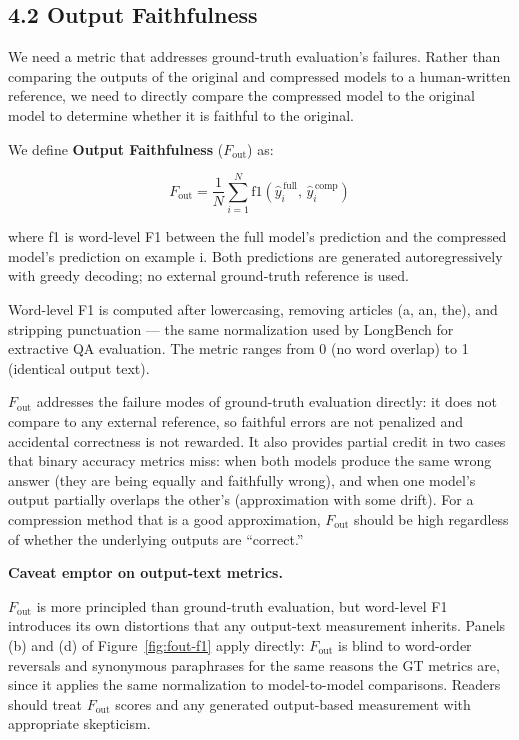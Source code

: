 \documentclass[10pt,letterpaper]{article}
\begin{document}
\hypertarget{output-faithfulness}{%
\subsection{4.2 Output Faithfulness}\label{output-faithfulness}}

We need a metric that addresses ground-truth evaluation’s failures. Rather than comparing the outputs
of the original and compressed models to a human-written reference, 
we need to directly compare the compressed model to
the original model to determine whether it is faithful to the original.

We define \textbf{Output Faithfulness}
(\(F_{\text{out}}\)) as:

\[
F_{\text{out}} = \frac{1}{N} \sum_{i=1}^{N}
  \text{f1}\!\left(\hat{y}^{\,\text{full}}_i,\, \hat{y}^{\,\text{comp}}_i\right)
\]

where f1 is word-level F1 between the full model's prediction and the
compressed model's prediction on example i. Both predictions are
generated autoregressively with greedy decoding; no external
ground-truth reference is used.

Word-level F1 is computed after lowercasing, removing articles (a, an,
the), and stripping punctuation --- the same normalization used by
LongBench for extractive QA evaluation. The metric ranges from 0 (no
word overlap) to 1 (identical output text).

\(F_{\text{out}}\) addresses the failure modes of ground-truth
evaluation directly: it does not compare to any external reference, so
faithful errors are not penalized and accidental correctness is not
rewarded. It also provides partial credit in two cases that binary
accuracy metrics miss: when both models produce the same wrong answer
(they are being equally and faithfully wrong), and when one model's
output partially overlaps the other's (approximation with some drift).
For a compression method that is a good approximation,
\(F_{\text{out}}\) should be high regardless of whether the underlying
outputs are ``correct.''


\textbf{Caveat emptor on output-text metrics.}

\nopagebreak
\(F_{\text{out}}\) is more principled than ground-truth evaluation, but word-level F1
introduces its own distortions that any output-text measurement
inherits. Panels (b) and (d) of Figure~\ref{fig:fout-f1} apply directly:
\(F_{\text{out}}\) is blind to word-order reversals and synonymous paraphrases for
the same reasons the GT metrics are, since it applies the same normalization to
model-to-model comparisons. Readers should treat \(F_{\text{out}}\) scores and any
generated output-based measurement with appropriate skepticism.
\end{document}
